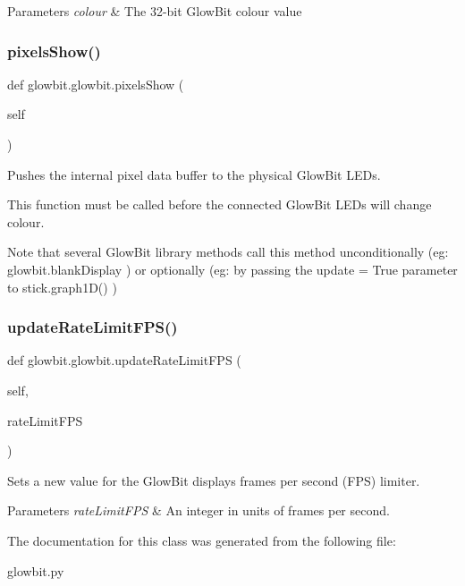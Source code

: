 \begin{DoxyParams}{Parameters}
{\em colour} & The 32-\/bit Glow\+Bit colour value \\
\hline
\end{DoxyParams}
\mbox{\label{classglowbit_1_1glowbit_a051aed2a4969fdcb0466e4e840209279}} 
\subsubsection{\texorpdfstring{pixels\+Show()}{pixelsShow()}}
{\footnotesize\ttfamily def glowbit.\+glowbit.\+pixels\+Show (\begin{DoxyParamCaption}\item[{}]{self }\end{DoxyParamCaption})}



Pushes the internal pixel data buffer to the physical Glow\+Bit L\+E\+Ds. 

This function must be called before the connected Glow\+Bit L\+E\+Ds will change colour.

Note that several Glow\+Bit library methods call this method unconditionally (eg\+: glowbit.\+blank\+Display ) or optionally (eg\+: by passing the update = True parameter to stick.\+graph1\+D() ) \mbox{\label{classglowbit_1_1glowbit_a7f72cb0878a688aa6181d4632428da09}} 
\subsubsection{\texorpdfstring{update\+Rate\+Limit\+F\+P\+S()}{updateRateLimitFPS()}}
{\footnotesize\ttfamily def glowbit.\+glowbit.\+update\+Rate\+Limit\+F\+PS (\begin{DoxyParamCaption}\item[{}]{self,  }\item[{}]{rate\+Limit\+F\+PS }\end{DoxyParamCaption})}



Sets a new value for the Glow\+Bit display\textquotesingle{}s frames per second (F\+PS) limiter. 


\begin{DoxyParams}{Parameters}
{\em rate\+Limit\+F\+PS} & An integer in units of frames per second. \\
\hline
\end{DoxyParams}


The documentation for this class was generated from the following file\+:\begin{DoxyCompactItemize}
\item 
glowbit.\+py\end{DoxyCompactItemize}
